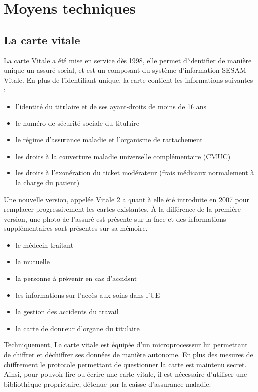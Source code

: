     \section{Moyens techniques}

    \subsection{La carte vitale}

    La carte Vitale a été mise en service dès 1998, elle permet d'identifier de manière unique un assuré social, et est un composant du
    système d'information SESAM-Vitale. En plus de l'identifiant unique, la carte contient
    les informations suivantes :

    \begin{itemize}
        \item l'identité du titulaire et de ses ayant-droits de moins de 16 ans
        \item le numéro de sécurité sociale du titulaire
        \item le régime d'assurance maladie et l'organisme de rattachement
        \item les droits à la couverture maladie universelle complémentaire (CMUC)
        \item les droits à l'exonération du ticket modérateur (frais médicaux normalement à la charge du patient)
    \end{itemize}

        Une nouvelle version, appelée Vitale 2 
    a quant à elle été introduite en 2007 pour remplacer progressivement les cartes existantes.
    À la différence de la première version, une photo de l'assuré est présente sur la face et des 
    informations supplémentaires sont présentes sur sa mémoire.

    \begin{itemize}
        \item le médecin traitant
        \item la mutuelle
        \item la personne à prévenir en cas d'accident
        \item les informations sur l'accès aux soins dans l'UE
        \item la gestion des accidents du travail
        \item la carte de donneur d'organe du titulaire
    \end{itemize}

    Techniquement, La carte vitale est équipée d'un microprocesseur lui permettant de chiffrer et
    déchiffrer ses données de manière autonome. En plus des mesures de chiffrement le protocole
    permettant de questionner la carte est maintenu secret. Ainsi, pour pouvoir lire ou écrire une carte vitale, 
    il est nécessaire d'utiliser une bibliothèque propriétaire, détenue par la caisse d'assurance maladie.

